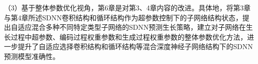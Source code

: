 （3）基于整体参数优化视角，第6章是对第3、4章内容的改进。具体地，将第3章与第4章所述SDNN卷积结构和循环结构作为超参数控制下的子网络结构状态，提出自适应混合多种不同特定类型子网络的SDNN预测生长策略，建立对子网络在生长过程中超参数、编码过程权重参数和生成过程权重参数的整体参数优化方法，进一步提升了自适应选择卷积结构和循环结构等混合深度神经子网络结构下的SDNN预测模型准确性。







